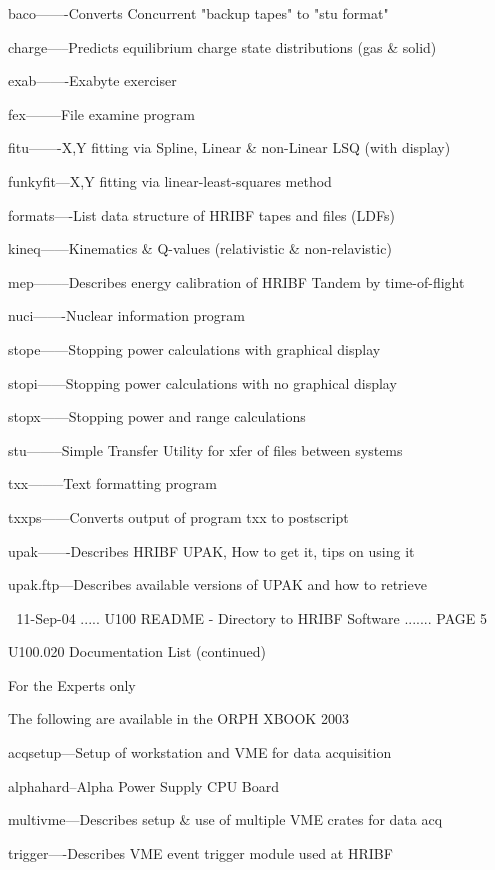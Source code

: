  
   baco-------Converts Concurrent "backup tapes" to "stu format"
 
   charge-----Predicts equilibrium charge state distributions (gas & solid)
 
   exab-------Exabyte exerciser
 
   fex--------File examine program
 
   fitu-------X,Y fitting via Spline, Linear & non-Linear LSQ (with display)
 
   funkyfit---X,Y fitting via linear-least-squares method
 
   formats----List data structure of HRIBF tapes and files (LDFs)
 
   kineq------Kinematics & Q-values (relativistic & non-relavistic)
 
   mep--------Describes energy calibration of HRIBF Tandem by time-of-flight
 
   nuci-------Nuclear information program
 
   stope------Stopping power calculations with    graphical display
 
   stopi------Stopping power calculations with no graphical display
 
   stopx------Stopping power and range calculations
 
   stu--------Simple Transfer Utility for xfer of files between systems
 
   txx--------Text formatting program
 
   txxps------Converts output of program txx to postscript
 
   upak-------Describes HRIBF UPAK, How to get it, tips on using it
 
   upak.ftp---Describes available versions of UPAK and how to retrieve
 
    
   11-Sep-04 ..... U100  README - Directory to HRIBF Software ....... PAGE   5
 
 
   U100.020  Documentation List (continued)
 
   For the Experts only
 
 
   The following are available in the ORPH XBOOK 2003
 
 
   acqsetup---Setup of workstation and VME for data acquisition
 
   alphahard--Alpha Power Supply CPU Board
 
   multivme---Describes setup & use of multiple VME crates for data acq
 
   trigger----Describes VME event trigger module used at HRIBF
 
